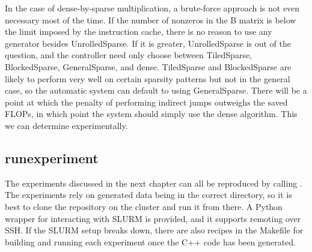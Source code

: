 In the case of dense-by-sparse multiplication, a brute-force approach is not even necessary most of the time. If the number of nonzeros in the B matrix is below the limit imposed by the instruction cache, there is no reason to use any generator besides UnrolledSparse. If it is greater, UnrolledSparse is out of the question, and the controller need only choose between TiledSparse, BlockedSparse, GeneralSparse, and dense. TiledSparse and BlockedSparse are likely to perform very well on certain sparsity patterns but not in the general case, so the automatic system can default to using GeneralSparse. There will be a point at which the penalty of performing indirect jumps outweighs the saved FLOPs, in which point the system should simply use the dense algorithm. This we can determine experimentally.


\subsection{runexperiment}

The experiments discussed in the next chapter can all be reproduced by calling . The experiments rely on generated data being in the correct directory, so it is best to clone the repository on the cluster and run it from there. A Python wrapper for interacting with SLURM is provided, and it supports remoting over SSH. If the SLURM setup breaks down, there are also recipes in the Makefile for building and running each experiment once the C++ code has been generated.






